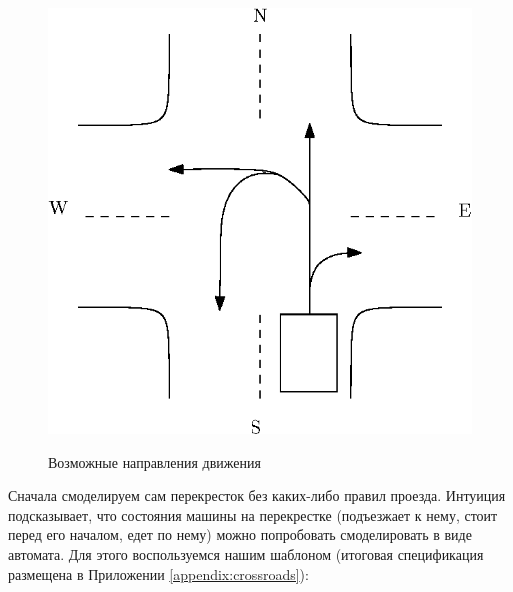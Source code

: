 \documentclass[14pt, openany]{report}
\newcounter{appendix}
\begin{document}
\begin{figure}[t]
\centering
\includegraphics{crossroads}
\label{fig:crossroads}
\caption{Возможные направления движения}
\end{figure}

Сначала смоделируем сам перекресток без каких-либо правил проезда. Интуиция подсказывает, что состояния машины на перекрестке (подъезжает к нему, стоит перед его началом, едет по нему) можно попробовать смоделировать в виде автомата. Для этого воспользуемся нашим шаблоном (итоговая спецификация размещена в Приложении \ref{appendix:crossroads}):
\end{document}
